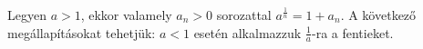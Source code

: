 Legyen $a>1$, ekkor valamely $a_n>0$ sorozattal $a^{\frac{1}{n}}=1+a_n$.
A következő megállapításokat tehetjük:
$a<1$ esetén alkalmazzuk $\frac{1}{a}$-ra a fentieket.
